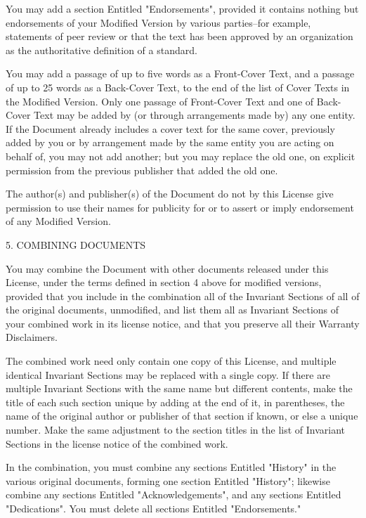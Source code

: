\documentclass[letterpaper]{book}
\begin{document}
You may add a section Entitled "Endorsements", provided it contains
nothing but endorsements of your Modified Version by various
parties--for example, statements of peer review or that the text has
been approved by an organization as the authoritative definition of a
standard.

You may add a passage of up to five words as a Front-Cover Text, and a
passage of up to 25 words as a Back-Cover Text, to the end of the list
of Cover Texts in the Modified Version. Only one passage of
Front-Cover Text and one of Back-Cover Text may be added by (or
through arrangements made by) any one entity. If the Document already
includes a cover text for the same cover, previously added by you or
by arrangement made by the same entity you are acting on behalf of,
you may not add another; but you may replace the old one, on explicit
permission from the previous publisher that added the old one.

The author(s) and publisher(s) of the Document do not by this License
give permission to use their names for publicity for or to assert or
imply endorsement of any Modified Version.

5. COMBINING DOCUMENTS

You may combine the Document with other documents released under this
License, under the terms defined in section 4 above for modified
versions, provided that you include in the combination all of the
Invariant Sections of all of the original documents, unmodified, and
list them all as Invariant Sections of your combined work in its
license notice, and that you preserve all their Warranty Disclaimers.

The combined work need only contain one copy of this License, and
multiple identical Invariant Sections may be replaced with a single
copy. If there are multiple Invariant Sections with the same name but
different contents, make the title of each such section unique by
adding at the end of it, in parentheses, the name of the original
author or publisher of that section if known, or else a unique number.
Make the same adjustment to the section titles in the list of
Invariant Sections in the license notice of the combined work.

In the combination, you must combine any sections Entitled "History"
in the various original documents, forming one section Entitled
"History"; likewise combine any sections Entitled "Acknowledgements",
and any sections Entitled "Dedications". You must delete all sections
Entitled "Endorsements."
\end{document}
